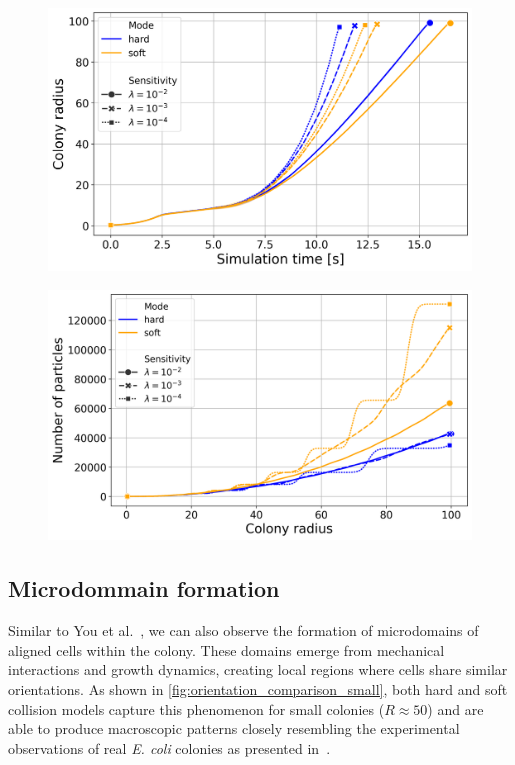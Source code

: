 \documentclass[conference]{IEEEtran}
\begin{document}
\begin{figure}[h]
    \centering
    \includegraphics[width=\linewidth]{figures/comparison_plots/combined_simulation_time [s]_vs_colony_radius.png}
    \caption{ }
\end{figure}

\begin{figure}[h]
    \centering
    \includegraphics[width=\linewidth]{figures/comparison_plots/combined_colony_radius_vs_num_particles.png}
    \caption{ }
\end{figure}

\newpage




\subsection{Microdommain formation}


Similar to You et al.~\cite{You2018,You_2021}, we can also observe the formation of microdomains of aligned cells within the colony. These domains emerge from mechanical interactions and growth dynamics, creating local regions where cells share similar orientations. As shown in \autoref{fig:orientation_comparison_small}, both hard and soft collision models capture this phenomenon for small colonies ($R \approx 50$) and are able to produce macroscopic patterns closely resembling the experimental observations of real \textit{E. coli} colonies as presented in~\cite{You2018}.
\end{document}
